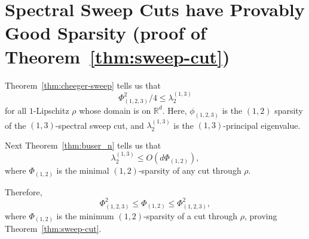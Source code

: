 \section{Spectral Sweep Cuts have Provably Good Sparsity (proof of
    Theorem~\ref{thm:sweep-cut})}\label{sec:sweep_cut}

Theorem~\ref{thm:cheeger-sweep} tells us that 
  \[ \Phi_{(1,2, 3)}^2/4 \leq \lambda_2^{(1,3)} \] for all $1$-Lipschitz $\rho$ whose
  domain is
  on $\mathbb{R}^d$.  Here, $\phi_{(1,2,3)}$ is the $(1,2)$ sparsity of the
  $(1,3)$-spectral sweep cut, and $\lambda_2^{(1,3)}$ is the
  $(1,3)$-principal eigenvalue. 

  Next Theorem~\ref{thm:buser_n} tells us that
 \[ \lambda_2^{(1,3)} \leq O(d \Phi_{(1,2)}), \]
 where $\Phi_{(1,2)}$ is the minimal $(1,2)$-sparsity of any cut through
 $\rho$.

 Therefore, 
 \[ \Phi_{(1,2,3)}^2 \leq  \Phi_{(1,2)} \leq \Phi_{(1,2,3)}^2,\] 
 where $\Phi_{(1,2)}$ is the minimum $(1,2)$-sparsity of a cut through
 $\rho$, proving Theorem~\ref{thm:sweep-cut}.
